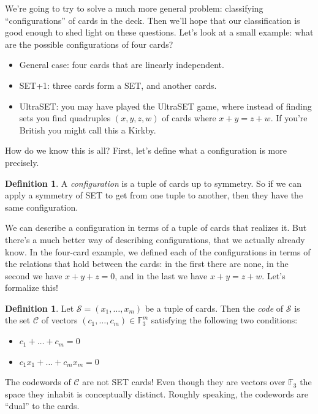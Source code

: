 \documentclass{article}
\theoremstyle{definition}
\newtheorem{defn}[thm]{Definition}
\theoremstyle{remark}
\begin{document}
We're going to try to solve a much more general problem: classifying ``configurations'' of cards in the deck. Then we'll hope that our classification is good enough to shed light on these questions. Let's look at a small example: what are the possible configurations of four cards?
\begin{itemize}
    \item General case: four cards that are linearly independent.
    \item SET+1: three cards form a SET, and another cards.
    \item UltraSET: you may have played the UltraSET game, where instead of finding sets you find quadruples $(x,y,z,w)$ of cards where $x+y=z+w$. If you're British you might call this a Kirkby.
\end{itemize}

How do we know this is all? First, let's define what a configuration is more precisely.

\begin{defn}
    A \emph{configuration} is a tuple of cards up to symmetry. So if we can apply a symmetry of SET to get from one tuple to another, then they have the same configuration.
\end{defn}

We can describe a configuration in terms of a tuple of cards that realizes it. But there's a much better way of describing configurations, that we actually already know. In the four-card example, we defined each of the configurations in terms of the relations that hold between the cards: in the first there are none, in the second we have $x+y+z=0$, and in the last we have $x+y=z+w$. Let's formalize this!

\begin{defn}
    Let $\mathcal S=(x_1,\dots,x_m)$ be a tuple of cards. Then the \emph{code} of $\mathcal S$ is the set $\mathcal C$ of vectors $(c_1,\dots,c_m)\in\mathbb F_3^m$ satisfying the following two conditions:
    \begin{itemize}
        \item $c_1+\dots+c_m=0$
        \item $c_1x_1+\dots+c_mx_m=0$
    \end{itemize}
\end{defn}

\begin{warning}
    The codewords of $\mathcal C$ are not SET cards! Even though they are vectors over $\mathbb F_3$ the space they inhabit is conceptually distinct. Roughly speaking, the codewords are ``dual'' to the cards.
\end{warning}
\end{document}
